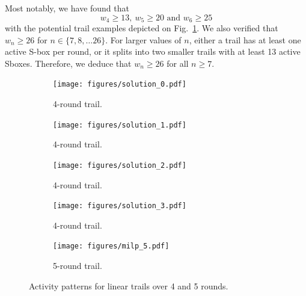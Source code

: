 Most notably, we have found that
\[w_4 \geq 13,\  w_5 \geq 20 \mbox{ and } w_6 \geq 25\]
with the potential trail examples depicted on Fig.~\ref{fig:trails}.
We also verified that \(w_n \geq 26\) for $n \in \{7, 8, \ldots 26\}$.
For larger values of $n$, either a trail has at least one active \gls{S-box} per
round, or it splits into two smaller trails with at least 13 active
Sboxes.  Therefore, we deduce that \(w_n \ge 26\) for all $n \ge 7$.

\begin{figure}[h]
  \centering
  \begin{subfigure}[t]{0.22\textwidth}
    \centering
    \texttt{[image: figures/solution\_0.pdf]}
    \caption{4-round trail.}
  \end{subfigure}
  \hfill
  \begin{subfigure}[t]{0.22\textwidth}
    \centering
    \texttt{[image: figures/solution\_1.pdf]}
    \caption{4-round trail.}
  \end{subfigure}
  \hfill
  \begin{subfigure}[t]{0.22\textwidth}
    \centering
    \texttt{[image: figures/solution\_2.pdf]}
    \caption{4-round trail.}
  \end{subfigure}
  \hfill
  \begin{subfigure}[t]{0.22\textwidth}
    \centering
    \texttt{[image: figures/solution\_3.pdf]}
    \caption{4-round trail.}
  \end{subfigure}
  
  \begin{subfigure}[t]{0.45\textwidth}
    \centering
    \texttt{[image: figures/milp\_5.pdf]}
    \caption{5-round trail.}
  \end{subfigure}
  \caption{Activity patterns for linear trails over 4 and 5 rounds.}
  \label{fig:trails}
\end{figure}



